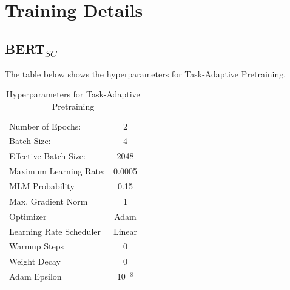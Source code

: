 \documentclass{report}
\theoremstyle{definition}
\theoremstyle{remark}
\begin{document}
\chapter{Training Details}
\section{BERT$_{SC}$}
\label{sec:app:bertsc}
The table below shows the hyperparameters for Task-Adaptive Pretraining.
\begin{table}[h!]
    \centering
    \begin{tabular}{|lc|}
    \hline
     Number of Epochs: & 2  \\
     Batch Size: & 4\\
     Effective Batch Size: & 2048 \\
     Maximum Learning Rate: & 0.0005 \\
     MLM Probability & 0.15 \\
     Max. Gradient Norm & 1 \\
     Optimizer & Adam \cite{adamopt} \\
     Learning Rate Scheduler & Linear \\
     Warmup Steps & 0 \\
     Weight Decay & 0 \\
     Adam Epsilon & 10$^{-8}$ \\
     \hline
    \end{tabular}
    \caption{Hyperparameters for Task-Adaptive Pretraining}
    \label{tab:pretrainhyper}
\end{table}
\newpage
\end{document}
